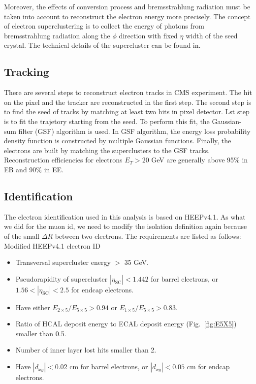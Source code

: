Moreover, the effects of conversion process and bremsstrahlung radiation must be taken into account to reconstruct the electron energy more precisely. The concept of electron superclustering is to collect the energy of photons from bremsstrahlung radiation along the $\phi$ direction with fixed $\eta$ width of the seed crystal. The technical details of the supercluster can be found in\cite{eleSC}.

\subsection*{Tracking}
There are several steps to reconstruct electron tracks in CMS experiment. The hit on the pixel and the tracker are reconstructed in the first step. The second step is to find the seed of tracks by matching at least two hits in pixel detector. Lst step is to fit the trajetory starting from the seed. To perform this fit, the Gaussian-sum filter (GSF) algorithm is used\cite{GSF}. In GSF algorithm, the energy loss probability density function is constructed by multiple Gaussian functions. Finally, the electrons are built by matching the superclusters to the GSF tracks. Reconstruction efficiencies for electrons $E_{T} > 20$ GeV are generally above 95\% in EB and 90\% in EE\cite{eleRecoEff}.

\subsection*{Identification}
The electron identification used in this analysis is based on HEEPv4.1\cite{HEEP}. As what we did for the muon id, we need to modify the isolation definition again because of the small $\Delta R$ between two electrons. The requirements are listed as follows:\\

Modified HEEPv4.1 electron ID
\begin{itemize}
\item Transversal supercluster energy $>$ 35 GeV.
\item Pseudorapidity of supercluster $|\eta_\mathrm{SC}| < 1.442$ for barrel electrons, or $1.56 < |\eta_{\mathrm{SC}}| < 2.5$ for endcap electrons.
\item Have either $E_{2\times 5}/E_{5\times 5} > 0.94$ or $E_{1\times 5}/E_{5\times 5} > 0.83$.
\item Ratio of HCAL deposit energy to ECAL deposit energy (Fig.~\ref{fig:E5X5}) smaller than 0.5.
\item Number of inner layer lost hits smaller than 2.
\item Have $|d_{xy}| < 0.02$ cm for barrel electrons, or $|d_{xy}| < 0.05$ cm for endcap electrons.\\
\end{itemize}

